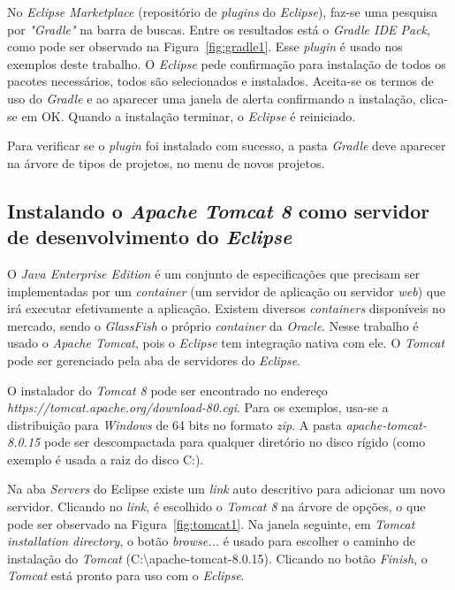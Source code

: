 No \textit{Eclipse Marketplace} (repositório de \textit{plugins} do \textit{Eclipse}), faz-se uma pesquisa por \textit{"Gradle"} na barra de buscas. Entre os resultados está o \textit{Gradle IDE Pack}, como pode ser observado na Figura~\ref{fig:gradle1}. Esse \textit{plugin} é usado nos exemplos deste trabalho. O \textit{Eclipse} pede confirmação para instalação de todos os pacotes necessários, todos são selecionados e instalados. Aceita-se os termos de uso do \textit{Gradle} e ao aparecer uma janela de alerta confirmando a instalação, clica-se em OK. Quando a instalação terminar, o \textit{Eclipse} é reiniciado.

Para verificar se o \textit{plugin} foi instalado com sucesso, a pasta \textit{Gradle} deve aparecer na árvore de tipos de projetos, no menu de novos projetos.


\subsection{Instalando o \textit{Apache Tomcat 8} como servidor de desenvolvimento do \textit{Eclipse}} 

O \textit{Java Enterprise Edition} é um conjunto de especificações que precisam ser implementadas por um \textit{container} (um servidor de aplicação ou servidor \textit{web}) que irá executar efetivamente a aplicação. Existem diversos \textit{containers} disponíveis no mercado, sendo o \textit{GlassFish} o próprio \textit{container} da \textit{Oracle}. Nesse trabalho é usado o \textit{Apache Tomcat}, pois o \textit{Eclipse} tem integração nativa com ele. O \textit{Tomcat} pode ser gerenciado pela aba de servidores do \textit{Eclipse}.

O instalador do \textit{Tomcat 8} pode ser encontrado no endereço \textit{https://tomcat.apache.org/download-80.cgi}. Para os exemplos, usa-se a distribuição para \textit{Windows} de 64 bits no formato \textit{zip}. A pasta \textit{apache-tomcat-8.0.15} pode ser descompactada para qualquer diretório no disco rígido (como exemplo é usada a raiz do disco C:).  

Na aba \textit{Servers} do Eclipse existe um \textit{link} auto descritivo para adicionar um novo servidor. Clicando no \textit{link}, é escolhido o \textit{Tomcat 8} na árvore de opções, o que pode ser observado na Figura~\ref{fig:tomcat1}. Na janela seguinte, em \textit{Tomcat installation directory}, o botão \textit{browse...} é usado para escolher o caminho de instalação do \textit{Tomcat} (C:\textbackslash apache-tomcat-\textmd{8.0.15}). Clicando no botão \textit{Finish}, o \textit{Tomcat} está pronto para uso com o \textit{Eclipse}. 

